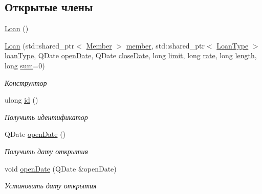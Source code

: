 \subsection*{Открытые члены}
\begin{DoxyCompactItemize}
\item 
\hyperlink{classkpk_1_1data_1_1_loan_a466384959c1ccfaf4942c96c3409e6e6}{Loan} ()
\item 
\hyperlink{classkpk_1_1data_1_1_loan_afe8d8c50d04caef057413f2739599c82}{Loan} (std\+::shared\+\_\+ptr$<$ \hyperlink{classkpk_1_1data_1_1_member}{Member} $>$ \hyperlink{classkpk_1_1data_1_1_loan_a37fb3cc07280aa8310a32b4477b5528f}{member}, std\+::shared\+\_\+ptr$<$ \hyperlink{classkpk_1_1data_1_1_loan_type}{Loan\+Type} $>$ \hyperlink{classkpk_1_1data_1_1_loan_a791850364c82ef161f09669c64bcc2a3}{loan\+Type}, Q\+Date \hyperlink{classkpk_1_1data_1_1_loan_a0b039c0e6667da4f809f8e921f359f9b}{open\+Date}, Q\+Date \hyperlink{classkpk_1_1data_1_1_loan_af8ccbb954480eae0aa3b2a6b2f39fcb5}{close\+Date}, long \hyperlink{classkpk_1_1data_1_1_loan_ae82f80aa7a9b58fdfb2ac818dd33611d}{limit}, long \hyperlink{classkpk_1_1data_1_1_loan_affb2d1a39a5c7c185b07d5f6de87a43e}{rate}, long \hyperlink{classkpk_1_1data_1_1_loan_a89c1fd9e63d8923796f0cb3452bafa27}{length}, long \hyperlink{classkpk_1_1data_1_1_loan_a5b207380d82a2079ea83ec1ecf11f090}{sum}=0)
\begin{DoxyCompactList}\small\item\em Конструктор \end{DoxyCompactList}\item 
ulong \hyperlink{classkpk_1_1data_1_1_loan_a2827052c65d91b314bf1573ab56ffa3d}{id} ()
\begin{DoxyCompactList}\small\item\em Получить идентификатор \end{DoxyCompactList}\item 
Q\+Date \hyperlink{classkpk_1_1data_1_1_loan_a0b039c0e6667da4f809f8e921f359f9b}{open\+Date} ()
\begin{DoxyCompactList}\small\item\em Получить дату открытия \end{DoxyCompactList}\item 
void \hyperlink{classkpk_1_1data_1_1_loan_a46351e2f11a23a671e2a2d4be126eb2b}{open\+Date} (Q\+Date \&open\+Date)
\begin{DoxyCompactList}\small\item\em Установить дату открытия \end{DoxyCompactList}\item 

\end{DoxyCompactItemize}
